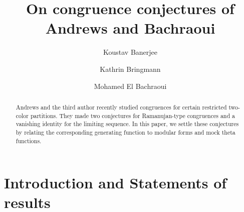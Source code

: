 \documentclass[12pt,reqno]{amsart}
\title{On congruence conjectures of Andrews and Bachraoui}
\author{Koustav Banerjee}
\author{Kathrin Bringmann}
\author{Mohamed El Bachraoui}
\newcommand{\z}{\zeta}
\renewcommand{\(}{\left\(}
\renewcommand{\)}{\right\)}
\numberwithin{equation}{section}
\theoremstyle{plain}
\theoremstyle{definition}
\numberwithin{equation}{section}
\newcommand{\kbf}{\bf\color{green!40!black!60!}}
\begin{document}
	


\begin{abstract}

Andrews and the third author recently studied congruences for certain restricted two-color partitions.  They made two conjectures for Ramanujan-type congruences and a vanishing identity for the limiting sequence. In this paper, we settle these conjectures by relating the corresponding generating function to modular forms and mock theta functions. %


\end{abstract}

\maketitle







\section{Introduction and Statements of results} 
\end{document}
